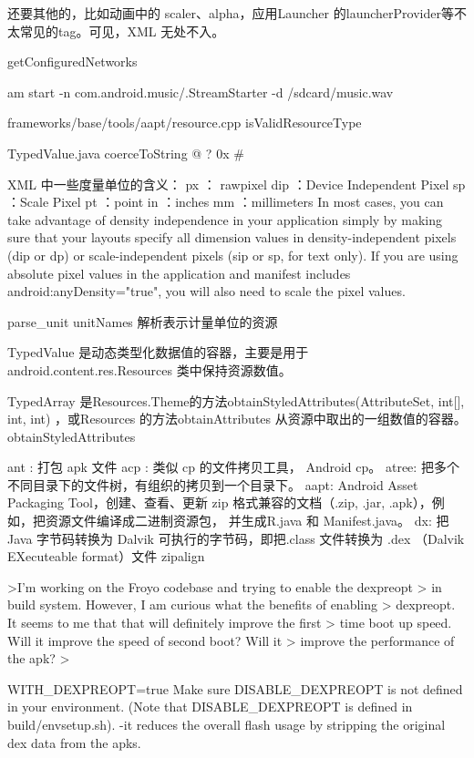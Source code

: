 \documentclass{book}
\begin{document}
\begin{CJK}{UTF8}{gbsn}
还要其他的，比如动画中的 scaler、alpha，应用Launcher 的launcherProvider等不太常见的tag。可见，XML 无处不入。

getConfiguredNetworks

am start -n com.android.music/.StreamStarter -d /sdcard/music.wav

frameworks/base/tools/aapt/resource.cpp    isValidResourceType

TypedValue.java      coerceToString   @ ? 0x #

XML 中一些度量单位的含义：
px   ： rawpixel
dip   ：Device Independent Pixel
sp    ：Scale Pixel
pt    ：point
in    ：inches
mm   ：millimeters
In most cases, you can take advantage of density independence in your application simply by making sure that your layouts specify all dimension values in density-independent pixels (dip or dp) or scale-independent pixels (sip or sp, for text only). If you are using absolute pixel values in the application and manifest includes android:anyDensity="true", you will also need to scale the pixel values.

parse_unit      unitNames      解析表示计量单位的资源

TypedValue 是动态类型化数据值的容器，主要是用于 android.content.res.Resources 类中保持资源数值。

TypedArray 是Resources.Theme的方法obtainStyledAttributes(AttributeSet, int[], int, int) ，或Resources 的方法obtainAttributes 从资源中取出的一组数值的容器。
obtainStyledAttributes




ant : 打包 apk 文件
acp : 类似 cp 的文件拷贝工具， Android cp。
atree: 把多个不同目录下的文件树，有组织的拷贝到一个目录下。
aapt: Android Asset Packaging Tool，创建、查看、更新 zip 格式兼容的文档（.zip, .jar, .apk），例如，把资源文件编译成二进制资源包， 并生成R.java 和 Manifest.java。
dx:  把 Java 字节码转换为 Dalvik 可执行的字节码，即把.class 文件转换为 .dex （Dalvik EXecuteable format）文件
zipalign

>I'm working on the Froyo codebase and trying to enable the dexpreopt
> in build system. However, I am curious what the benefits of enabling
> dexpreopt. It seems to me that that will definitely improve the first
> time boot up speed. Will it improve the speed of second boot? Will it
> improve the performance of the apk?
>

WITH_DEXPREOPT=true 
Make sure DISABLE_DEXPREOPT is not defined in your environment.
(Note that DISABLE_DEXPREOPT is defined in build/envsetup.sh). 
-it reduces the overall flash usage by stripping the original dex data
from the apks.


\end{CJK}
\end{document}
